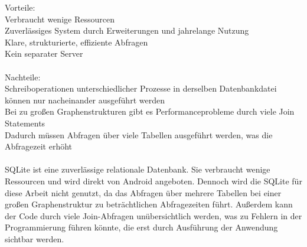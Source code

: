 Vorteile:\\
Verbraucht wenige Ressourcen\\
Zuverlässiges System durch Erweiterungen und jahrelange Nutzung\\
Klare, strukturierte, effiziente Abfragen\\
Kein separater Server\\\\
Nachteile: \\
Schreiboperationen unterschiedlicher Prozesse in derselben Datenbankdatei können nur nacheinander ausgeführt werden\\
Bei zu großen Graphenstrukturen gibt es Performanceprobleme durch viele Join Statements\\
Dadurch müssen Abfragen über viele Tabellen ausgeführt werden, was die Abfragezeit erhöht\\\\
SQLite ist eine zuverlässige relationale Datenbank. Sie verbraucht wenige Ressourcen und wird direkt von Android angeboten. Dennoch wird die SQLite für diese Arbeit nicht genutzt, da das Abfragen über mehrere Tabellen bei einer großen Graphenstruktur zu beträchtlichen Abfragezeiten führt. Außerdem kann der Code durch viele Join-Abfragen unübersichtlich werden, was zu Fehlern in der Programmierung führen könnte, die erst durch Ausführung der Anwendung sichtbar werden.





